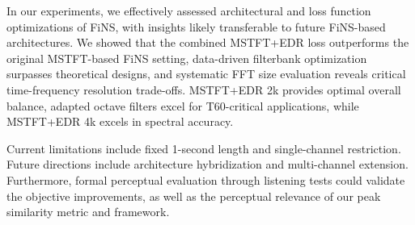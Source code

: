 \documentclass[conference]{IEEEtran}
\begin{document}
In our experiments, we effectively assessed architectural and loss function optimizations of FiNS, with insights likely transferable to future FiNS-based architectures. We showed that the combined MSTFT+EDR loss outperforms the original MSTFT-based FiNS setting, data-driven filterbank optimization surpasses theoretical designs, and systematic FFT size evaluation reveals critical time-frequency resolution trade-offs. MSTFT+EDR 2k provides optimal overall balance, adapted octave filters excel for T60-critical applications, while MSTFT+EDR 4k excels in spectral accuracy.

Current limitations include fixed 1-second length and single-channel restriction. Future directions include architecture hybridization and multi-channel extension. Furthermore, formal perceptual evaluation through listening tests could validate the objective improvements, as well as the perceptual relevance of our peak similarity metric and framework.
 
 


 
\end{document}
